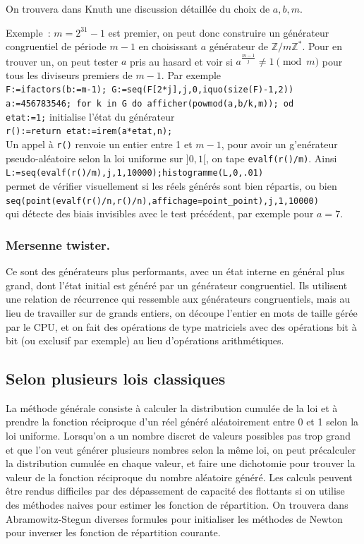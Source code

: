 \documentclass[a4paper,11pt]{article}
\newcommand{\Z}{{\mathbb{Z}}}
\begin{document}
On trouvera dans Knuth une discussion détaillée du choix de $a,b,m$.


Exemple~: $m=2^{31}-1$ est premier, on peut donc construire un
g\'en\'erateur congruentiel de p\'eriode $m-1$ en choisissant $a$
g\'en\'erateur de $\Z/m\Z^*$. Pour en trouver un, on peut tester
$a$ pris au hasard et voir si $a^{\frac{m-1}{j}} \neq 1 \pmod m$
pour tous les diviseurs premiers de $m-1$. Par exemple\\
\verb|F:=ifactors(b:=m-1); G:=seq(F[2*j],j,0,iquo(size(F)-1,2))|\\
\verb|a:=456783546; for k in G do afficher(powmod(a,b/k,m)); od|\\
\verb|etat:=1;| initialise l'\'etat du g\'en\'erateur\\
\verb|r():=return etat:=irem(a*etat,n);|\\
Un appel \`a \verb|r()| renvoie un entier entre 1 et $m-1$, pour avoir
un g'en\'erateur pseudo-al\'eatoire selon la loi uniforme sur $]0,1[$, on tape
\verb|evalf(r()/m)|.
Ainsi \\
\verb|L:=seq(evalf(r()/m),j,1,10000);histogramme(L,0,.01)|\\
permet de v\'erifier visuellement si les r\'eels g\'en\'er\'es sont
bien r\'epartis, ou bien\\
\verb|seq(point(evalf(r()/n,r()/n),affichage=point_point),j,1,10000)|\\
qui d\'etecte des biais invisibles avec le test pr\'ec\'edent, par
exemple pour $a=7$.

\subsubsection{Mersenne twister.}
Ce sont des générateurs plus performants, avec un état interne
en général plus grand, dont l'état initial est généré par
un générateur congruentiel. Ils utilisent une relation
de r\'ecurrence qui ressemble aux g\'en\'erateurs
congruentiels, mais au lieu de travailler sur de grands
entiers, on d\'ecoupe l'entier en mots de taille g\'er\'ee
par le CPU, et on fait des op\'erations de type matriciels
avec des op\'erations bit \`a bit (ou exclusif par exemple)
au lieu d'op\'erations arithm\'etiques.

\subsection{Selon plusieurs lois classiques}
La m\'ethode g\'en\'erale consiste \`a calculer la distribution
cumul\'ee de la loi et \`a prendre la fonction r\'eciproque
d'un r\'eel g\'en\'er\'e al\'eatoirement entre 0 et 1 selon
la loi uniforme. Lorsqu'on a un nombre discret de valeurs possibles
pas trop grand et que l'on veut g\'en\'erer plusieurs
nombres selon la m\^eme loi, on peut pr\'ecalculer la distribution cumul\'ee
en chaque valeur, et faire une dichotomie pour trouver
la valeur de la fonction r\'eciproque du nombre al\'eatoire
g\'en\'er\'e. Les calculs peuvent être rendus difficiles
par des dépassement de capacité des flottants si on utilise
des méthodes naives pour estimer les fonction de répartition.
On trouvera dans Abramowitz-Stegun diverses formules 
pour initialiser les méthodes de Newton pour inverser les
fonction de répartition courante.
\end{document}
